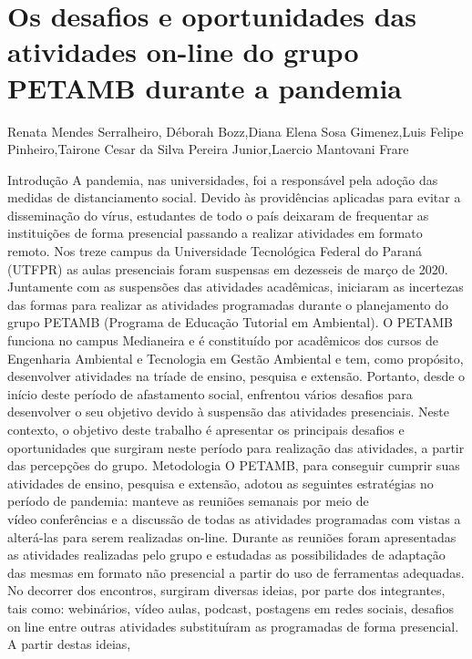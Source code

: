 

\section{Os desafios e oportunidades das atividades on-line do grupo PETAMB durante a pandemia}

Renata Mendes Serralheiro, Déborah Bozz,Diana Elena Sosa Gimenez,Luis Felipe Pinheiro,Tairone Cesar da Silva Pereira Junior,Laercio Mantovani Frare

Introdução
A pandemia, nas universidades, foi a responsável pela adoção das medidas de distanciamento 
social. Devido às providências aplicadas para evitar a disseminação do vírus, estudantes de todo o 
país deixaram de frequentar as instituições de forma presencial passando a realizar atividades em 
formato remoto. Nos treze campus da Universidade Tecnológica Federal do Paraná (UTFPR) as 
aulas presenciais foram suspensas em dezesseis de março de 2020. Juntamente com as suspensões 
das atividades acadêmicas, iniciaram as incertezas das formas para realizar as atividades 
programadas durante o planejamento do grupo PETAMB (Programa de Educação Tutorial em 
Ambiental). O PETAMB funciona no campus Medianeira e é constituído por acadêmicos dos 
cursos de Engenharia Ambiental e Tecnologia em Gestão Ambiental e tem, como propósito, 
desenvolver atividades na tríade de ensino, pesquisa e extensão. Portanto, desde o início deste 
período de afastamento social, enfrentou vários desafios para desenvolver o seu objetivo devido à 
suspensão das atividades presenciais. Neste contexto, o objetivo deste trabalho é apresentar os 
principais desafios e oportunidades que surgiram neste período para realização das atividades, a 
partir das percepções do grupo.
Metodologia
O PETAMB, para conseguir cumprir suas atividades de ensino, pesquisa e extensão, adotou as 
seguintes estratégias no período de pandemia: manteve as reuniões semanais por meio de vídeoconferências e a discussão de todas as atividades programadas com vistas a alterá-las para serem 
realizadas on-line. Durante as reuniões foram apresentadas as atividades realizadas pelo grupo e 
estudadas as possibilidades de adaptação das mesmas em formato não presencial a partir do uso 
de ferramentas adequadas. No decorrer dos encontros, surgiram diversas ideias, por parte dos 
integrantes, tais como: webinários, vídeo aulas, podcast, postagens em redes sociais, desafios online entre outras atividades substituíram as programadas de forma presencial. A partir destas ideias, 
